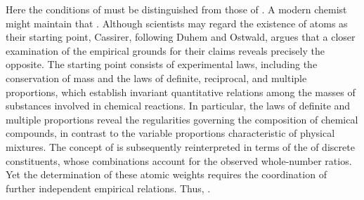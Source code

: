 Here the conditions of  must be distinguished from those of  . A modern chemist might maintain that  . Although scientists may regard the existence of atoms as their starting point, Cassirer, following Duhem and Ostwald, argues that a closer examination of the empirical grounds for their claims reveals precisely the opposite. The starting point consists of experimental laws, including the conservation of mass and the laws of definite, reciprocal, and multiple proportions, which establish invariant quantitative relations among the masses of substances involved in chemical reactions. In particular, the laws of definite and multiple proportions reveal the regularities governing the composition of chemical compounds, in contrast to the variable proportions characteristic of physical mixtures. The concept of  is subsequently reinterpreted in terms of the  of discrete constituents, whose combinations account for the observed whole-number ratios. Yet the determination of these atomic weights requires the coordination of further independent empirical relations. Thus,  .

